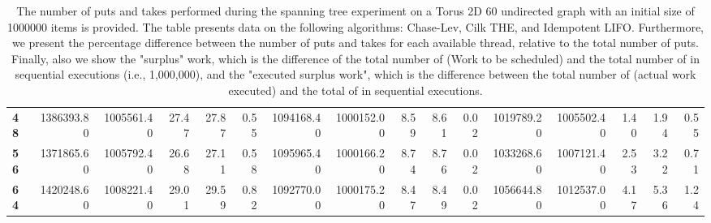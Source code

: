 \begin{table}[!ht]
{\begin{tabular}{lrrrrrrrrrrrrrrr}
\textbf{48} & 1386393.80 & 1005561.40 &          27.47 &       27.87 &                 0.55 & 1094168.40 & 1000152.00 &           8.59 &        8.61 &                 0.02 &      1019789.20 & 1005502.40 &           1.40 &        1.94 &                 0.55 \\
\textbf{56} & 1371865.60 & 1005792.40 &          26.68 &       27.11 &                 0.58 & 1095965.40 & 1000166.20 &           8.74 &        8.76 &                 0.02 &      1033268.60 & 1007121.40 &           2.53 &        3.22 &                 0.71 \\
\textbf{64} & 1420248.60 & 1008221.40 &          29.01 &       29.59 &                 0.82 & 1092770.00 & 1000175.20 &           8.47 &        8.49 &                 0.02 &      1056644.80 & 1012537.00 &           4.17 &        5.36 &                 1.24 \\
\bottomrule
\end{tabular}}
\label{difference-Torus_2D_60_undirected-1000000-CHASELEV-CILK-IDEMPOTENT_LIFO}
\caption{The number of puts and takes performed during the
    spanning tree experiment on a Torus 2D 60 undirected graph with an initial size
    of 1000000 items is provided. The table presents data on the
    following algorithms: Chase-Lev, Cilk THE, and
    Idempotent LIFO. Furthermore, we present the percentage difference
    between the number of puts and takes for each available thread,
    relative to the total number of puts. Finally, also we show the
    "surplus" work, which is the difference of the total number of
    \Puts (Work to be scheduled) and the total number of \Puts in
    sequential executions (i.e., 1,000,000), and the "executed surplus
    work", which is the difference between the total number of \Takes
    (actual work executed) and the total of \Takes in sequential
    executions.}
\end{table}
